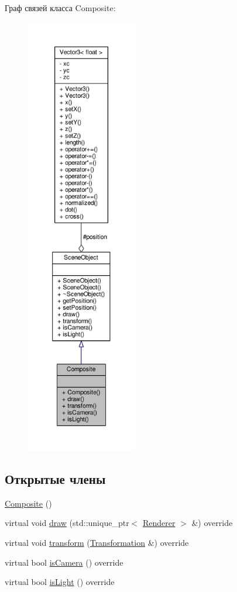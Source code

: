 Граф связей класса Composite\+:
\nopagebreak
\begin{figure}[H]
\begin{center}
\leavevmode
\includegraphics[height=550pt]{da/db3/class_composite__coll__graph}
\end{center}
\end{figure}
\subsection*{Открытые члены}
\begin{DoxyCompactItemize}
\item 
\hyperlink{class_composite_ad28832d957183a7f08dec72e6040db0a}{Composite} ()
\item 
virtual void \hyperlink{class_composite_a95e3d893a3e3ec8bbb2dc449278b64c4}{draw} (std\+::unique\+\_\+ptr$<$ \hyperlink{class_renderer}{Renderer} $>$ \&) override
\item 
virtual void \hyperlink{class_composite_afaae38bc8ef323cf05bf5710dafbeb39}{transform} (\hyperlink{class_transformation}{Transformation} \&) override
\item 
virtual bool \hyperlink{class_composite_a041e0a198c3c2fcc7b16f36a7511f7c3}{is\+Camera} () override
\item 
virtual bool \hyperlink{class_composite_a704e2e6583b8c553cbc5d1ddedea529d}{is\+Light} () override
\end{DoxyCompactItemize}
